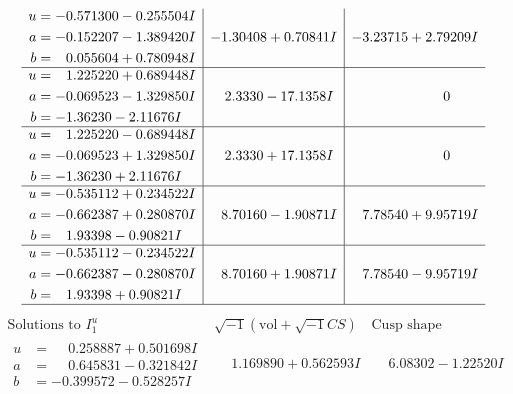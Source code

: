 \documentclass[1p]{elsarticle_modified}
\theoremstyle{definition}
\newcommand{\I}{\sqrt{-1}}
\begin{document}
$$\begin{array}{c|c|c}
\begin{aligned}
u &= -0.571300 - 0.255504 I \\
a &= -0.152207 - 1.389420 I \\
b &= \phantom{-}0.055604 + 0.780948 I\end{aligned}
 & -1.30408 + 0.70841 I & -3.23715 + 2.79209 I \\ \hline\begin{aligned}
u &= \phantom{-}1.225220 + 0.689448 I \\
a &= -0.069523 - 1.329850 I \\
b &= -1.36230 - 2.11676 I\end{aligned}
 & \phantom{-}2.3330 - 17.1358 I & \phantom{-0.000000 } 0 \\ \hline\begin{aligned}
u &= \phantom{-}1.225220 - 0.689448 I \\
a &= -0.069523 + 1.329850 I \\
b &= -1.36230 + 2.11676 I\end{aligned}
 & \phantom{-}2.3330 + 17.1358 I & \phantom{-0.000000 } 0 \\ \hline\begin{aligned}
u &= -0.535112 + 0.234522 I \\
a &= -0.662387 + 0.280870 I \\
b &= \phantom{-}1.93398 - 0.90821 I\end{aligned}
 & \phantom{-}8.70160 - 1.90871 I & \phantom{-}7.78540 + 9.95719 I \\ \hline\begin{aligned}
u &= -0.535112 - 0.234522 I \\
a &= -0.662387 - 0.280870 I \\
b &= \phantom{-}1.93398 + 0.90821 I\end{aligned}
 & \phantom{-}8.70160 + 1.90871 I & \phantom{-}7.78540 - 9.95719 I\\
 \hline 
 \end{array}$$\newpage$$\begin{array}{c|c|c}  
\text{Solutions to }I^u_{1}& \I (\text{vol} + \sqrt{-1}CS) & \text{Cusp shape}\\
 \hline 
\begin{aligned}
u &= \phantom{-}0.258887 + 0.501698 I \\
a &= \phantom{-}0.645831 - 0.321842 I \\
b &= -0.399572 - 0.528257 I\end{aligned}
 & \phantom{-}1.169890 + 0.562593 I & \phantom{-}6.08302 - 1.22520 I \\ \hline\begin{aligned}

\end{aligned}
\end{array}$$
\end{document}
